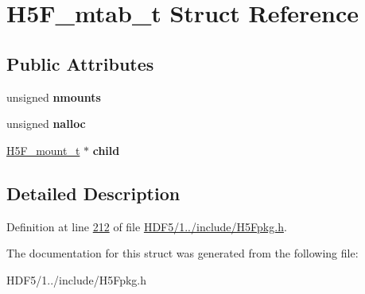 \hypertarget{struct_h5_f__mtab__t}{}\section{H5\+F\+\_\+mtab\+\_\+t Struct Reference}
\label{struct_h5_f__mtab__t}
\subsection*{Public Attributes}
\begin{DoxyCompactItemize}
\item 
\mbox{\label{struct_h5_f__mtab__t_a935d8067c0a0e37a84840780cc56b4bf}} 
unsigned {\bfseries nmounts}
\item 
\mbox{\label{struct_h5_f__mtab__t_a10c1d2e0091bcf4b433cb91c69f58a6d}} 
unsigned {\bfseries nalloc}
\item 
\mbox{\label{struct_h5_f__mtab__t_ab74badedf5ea1ee60142571976652e01}} 
\hyperlink{struct_h5_f__mount__t}{H5\+F\+\_\+mount\+\_\+t} $\ast$ {\bfseries child}
\end{DoxyCompactItemize}


\subsection{Detailed Description}


Definition at line \hyperlink{_h_d_f5_21_810_81_2include_2_h5_fpkg_8h_source_l00212}{212} of file \hyperlink{_h_d_f5_21_810_81_2include_2_h5_fpkg_8h_source}{H\+D\+F5/1../include/\+H5\+Fpkg.\+h}.



The documentation for this struct was generated from the following file\+:\begin{DoxyCompactItemize}
\item 
H\+D\+F5/1../include/\+H5\+Fpkg.\+h\end{DoxyCompactItemize}
